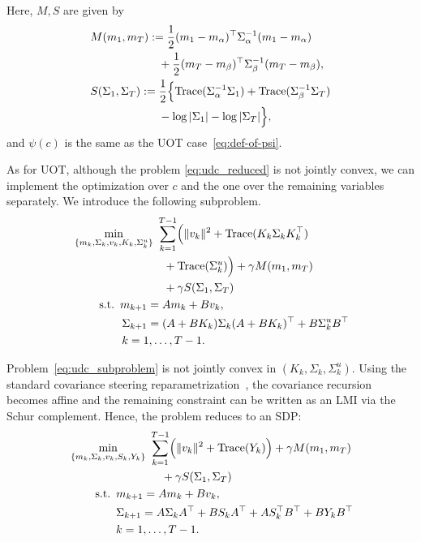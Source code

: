 \documentclass{ifacconf}
\newcommand{\tr}{\mathop{\rm Trace}\nolimits}
\begin{document}
Here, \(M, S\) are given by
\begin{align}
    &M(m_1,m_T)
    :=\frac12(m_1-m_\alpha)^\top \Sigma_\alpha^{-1}(m_1-m_\alpha) \nonumber\\
    &\qquad\qquad\qquad+\frac12(m_T-m_\beta)^\top \Sigma_\beta^{-1}(m_T-m_\beta),
    \label{eq:M_def}\\
    &S(\Sigma_1,\Sigma_T) :=\frac12\Bigl\{\tr(\Sigma_\alpha^{-1}\Sigma_1)+\tr(\Sigma_\beta^{-1}\Sigma_T)\nonumber\\
    &\qquad\qquad\qquad-\log|\Sigma_1|-\log|\Sigma_T|\Bigr\},\label{eq:S_def}
\end{align}
and $\psi(c)$ is the same as the UOT case~\eqref{eq:def-of-psi}. 


As for UOT, although the problem \eqref{eq:udc_reduced} is not jointly convex, we can implement the  optimization over \(c\) and the one over the remaining variables separately. We introduce the following subproblem.
\begin{align}\label{eq:udc_subproblem}
    &\min_{\{m_k,\Sigma_k,v_k,K_k,\Sigma^u_k\}} \,\,   \sum_{k=1}^{T-1}\Bigl(\|v_k\|^2 + \tr(K_k\Sigma_k K_k^\top) \nonumber\\
    & \qquad\qquad\qquad\qquad+ \tr(\Sigma^u_k)\Bigr) + \gamma M(m_1,m_T)  \nonumber\\
    & \qquad\qquad\qquad\qquad+ \gamma S(\Sigma_1,\Sigma_T)  \\
    &\qquad\,\, \text{s.t.}\,\,\, m_{k+1}=A m_k + B v_k,\nonumber\\
    & \qquad\qquad\,\,\Sigma_{k+1}=(A+BK_k)\Sigma_k(A+BK_k)^\top + B\Sigma^u_kB^\top \nonumber\\
    &\qquad\qquad\,\,k=1,\dots,T-1.\nonumber
\end{align}




Problem~\eqref{eq:udc_subproblem} is not jointly convex in $(K_k,\Sigma_k,\Sigma_k^u)$.
Using the standard covariance steering reparametrization~\cite{Balci2022}, the covariance recursion becomes affine and the remaining constraint can be written as an LMI via the Schur complement. Hence, the problem reduces to an SDP:
\begin{align}\label{eq:sdp_subproblem}
    &\min_{\{m_k,\Sigma_k,v_k,S_k,Y_k\}} \,\,  \sum_{k=1}^{T-1}\Bigl(\|v_k\|^2 + \tr(Y_k)\Bigr) + \gamma M(m_1,m_T)  \nonumber\\
    &\qquad\qquad\qquad\qquad\,+ \gamma S(\Sigma_1,\Sigma_T)\\
    &\qquad\,\, \text{s.t.}\,\,\, m_{k+1}=A m_k + B v_k,\nonumber\\
    & \qquad\qquad\,\Sigma_{k+1} = A\Sigma_k A^\top + BS_kA^\top + AS_k^\top B^\top + BY_kB^\top \nonumber\\
    &\qquad\qquad\,k=1,\dots,T-1.\nonumber
\end{align}
\end{document}
